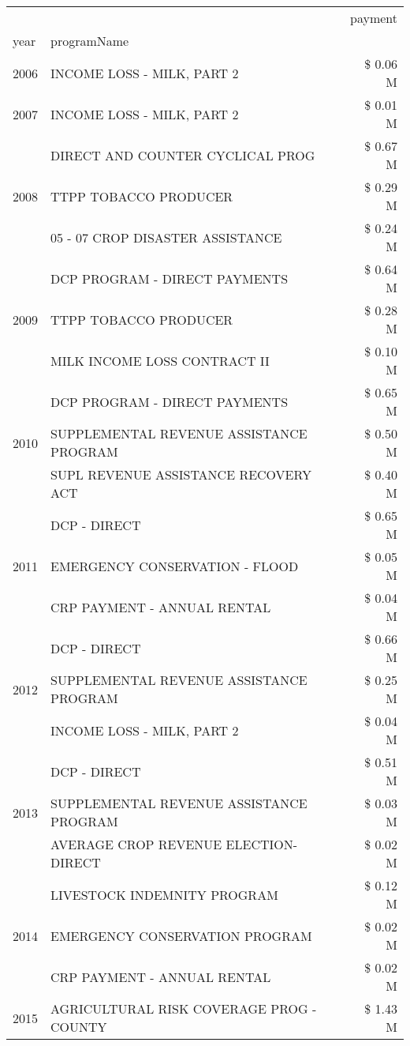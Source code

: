 \begin{tabular}{llr}
\toprule
 &  & payment \\
year & programName &  \\
\midrule
2006 & INCOME LOSS - MILK, PART 2 & \$ 0.06 M \\
\cline{1-3}
2007 & INCOME LOSS - MILK, PART 2 & \$ 0.01 M \\
\cline{1-3}
\multirow[t]{3}{*}{2008} & DIRECT AND COUNTER CYCLICAL PROG & \$ 0.67 M \\
 & TTPP TOBACCO PRODUCER & \$ 0.29 M \\
 & 05 - 07 CROP DISASTER ASSISTANCE & \$ 0.24 M \\
\cline{1-3}
\multirow[t]{3}{*}{2009} & DCP PROGRAM - DIRECT PAYMENTS & \$ 0.64 M \\
 & TTPP TOBACCO PRODUCER & \$ 0.28 M \\
 & MILK INCOME LOSS CONTRACT II & \$ 0.10 M \\
\cline{1-3}
\multirow[t]{3}{*}{2010} & DCP PROGRAM - DIRECT PAYMENTS & \$ 0.65 M \\
 & SUPPLEMENTAL REVENUE ASSISTANCE PROGRAM & \$ 0.50 M \\
 & SUPL REVENUE ASSISTANCE RECOVERY ACT & \$ 0.40 M \\
\cline{1-3}
\multirow[t]{3}{*}{2011} & DCP - DIRECT & \$ 0.65 M \\
 & EMERGENCY CONSERVATION - FLOOD & \$ 0.05 M \\
 & CRP PAYMENT - ANNUAL RENTAL & \$ 0.04 M \\
\cline{1-3}
\multirow[t]{3}{*}{2012} & DCP - DIRECT & \$ 0.66 M \\
 & SUPPLEMENTAL REVENUE ASSISTANCE PROGRAM & \$ 0.25 M \\
 & INCOME LOSS - MILK, PART 2 & \$ 0.04 M \\
\cline{1-3}
\multirow[t]{3}{*}{2013} & DCP - DIRECT & \$ 0.51 M \\
 & SUPPLEMENTAL REVENUE ASSISTANCE PROGRAM & \$ 0.03 M \\
 & AVERAGE CROP REVENUE ELECTION-DIRECT & \$ 0.02 M \\
\cline{1-3}
\multirow[t]{3}{*}{2014} & LIVESTOCK INDEMNITY PROGRAM & \$ 0.12 M \\
 & EMERGENCY CONSERVATION PROGRAM & \$ 0.02 M \\
 & CRP PAYMENT - ANNUAL RENTAL & \$ 0.02 M \\
\cline{1-3}
\multirow[t]{3}{*}{2015} & AGRICULTURAL RISK COVERAGE PROG - COUNTY & \$ 1.43 M \\

\end{tabular}
